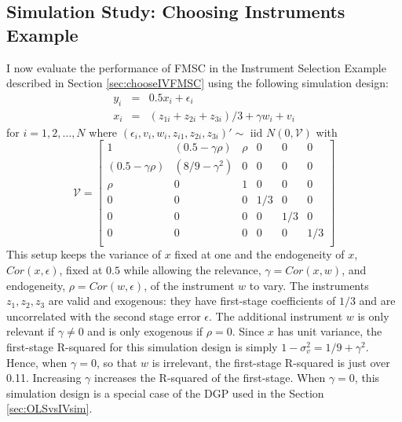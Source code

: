 \subsection{Simulation Study: Choosing Instruments Example}\label{sec:chooseIVsim}
I now evaluate the performance of FMSC in the Instrument Selection Example described in Section \ref{sec:chooseIVFMSC} using the following simulation design:
\begin{eqnarray}
		y_i &=& 0.5 x_i + \epsilon_i\\ 
		\label{eq:chooseIVDGP1}
		x_i &=& (z_{1i} + z_{2i} + z_{3i}) /3 + \gamma w_i + v_i 
		\label{eq:chooseIVDGP2}
	\end{eqnarray}
for $i=1, 2, \hdots, N$ where $(\epsilon_i, v_i, w_i, z_{i1}, z_{2i}, z_{3i})' \sim \mbox{ iid  } N(0,\mathcal{V})$ with	
\begin{equation}
			\mathcal{V} = \left[  
				\begin{array}{cccccc}
				1 & (0.5 - \gamma \rho) & \rho & 0 & 0 & 0\\
				(0.5 - \gamma \rho) & (8/9 - \gamma^2) & 0 & 0 & 0 & 0 \\
				\rho & 0 & 1 & 0 & 0 & 0\\
				0 & 0 & 0 & 1/3 & 0 & 0\\
				0 & 0 & 0 & 0 & 1/3 & 0\\
				0 & 0 & 0 & 0 & 0 & 1/3\\
				\end{array}
		\right]
		\label{eq:chooseIVDGP3}
\end{equation}
This setup keeps the variance of $x$ fixed at one and the endogeneity of $x$, $Cor(x, \epsilon)$, fixed at $0.5$ while allowing the relevance, $\gamma = Cor(x,w)$, and endogeneity, $\rho = Cor(w, \epsilon)$, of the instrument $w$ to vary.
The instruments $z_1, z_2, z_3$ are valid and exogenous: they have first-stage coefficients of $1/3$ and are uncorrelated with the second stage error $\epsilon$.
The additional instrument $w$ is only relevant if $\gamma \neq 0$ and is only exogenous if $\rho = 0$.
Since $x$ has unit variance, the first-stage R-squared for this simulation design is simply $1 - \sigma_v^2 = 1/9 + \gamma^2$.
Hence, when  $\gamma = 0$, so that $w$ is irrelevant, the first-stage R-squared is just over 0.11.
Increasing $\gamma$ increases the R-squared of the first-stage.
When $\gamma = 0$, this simulation design is a special case of the DGP used in the Section \ref{sec:OLSvsIVsim}.

